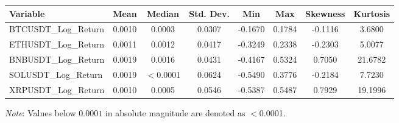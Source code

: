 \begin{tabular}{lccccccc}
  \toprule
  \textbf{Variable} & \textbf{Mean} & \textbf{Median} & \textbf{Std. Dev.} & \textbf{Min} & \textbf{Max} & \textbf{Skewness} & \textbf{Kurtosis} \\ 
  \midrule
  BTCUSDT\_Log\_Return & 0.0010 & 0.0003 & 0.0307 & -0.1670 & 0.1784 & -0.1116 & 3.6800 \\ 
  ETHUSDT\_Log\_Return & 0.0011 & 0.0012 & 0.0417 & -0.3249 & 0.2338 & -0.2303 & 5.0077 \\ 
  BNBUSDT\_Log\_Return & 0.0019 & 0.0016 & 0.0431 & -0.4167 & 0.5324 & 0.7050 & 21.6782 \\ 
  SOLUSDT\_Log\_Return & 0.0019 & $<$0.0001 & 0.0624 & -0.5490 & 0.3776 & -0.2184 & 7.7230 \\ 
  XRPUSDT\_Log\_Return & 0.0010 & 0.0005 & 0.0546 & -0.5387 & 0.5487 & 0.7929 & 19.1996 \\ 
  \bottomrule
\end{tabular}
\par\vspace{4pt}
\begin{minipage}{\linewidth}
  \footnotesize \textit{Note}: Values below $0.0001$ in absolute magnitude are denoted as $<$0.0001.
\end{minipage}